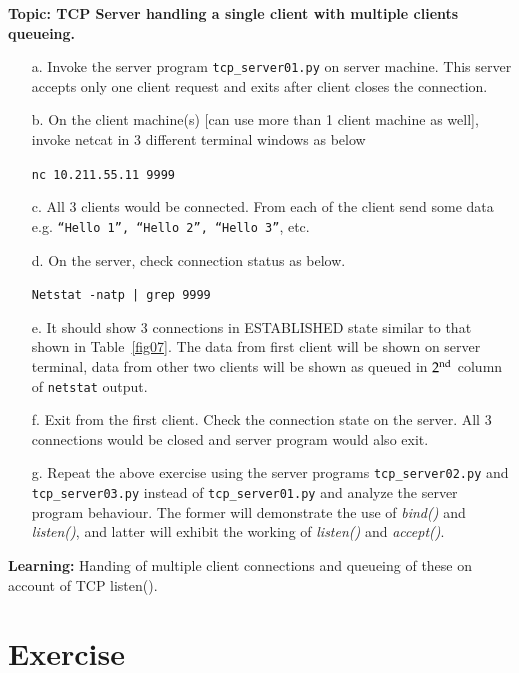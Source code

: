 \begin{multicols}{2}
\textbf{Topic: TCP Server handling a single client with multiple clients queueing.}

\begin{itemize}
\item[a.] Invoke the server program \texttt{tcp\_server01.py} on server machine. This server accepts only one client request and exits after client closes the connection.

\item[b.] On the client machine(s) [can use more than 1 client machine as well], invoke netcat in 3 different terminal windows as below

\texttt{nc 10.211.55.11 9999}

\item[c.] All 3 clients would be connected. From each of the client send some data e.g. \texttt{“Hello 1”, “Hello 2”, “Hello 3”}, etc.

\item[d.] On the server, check connection status as below. 

\texttt{Netstat -natp | grep 9999}

\item[e.] It should show 3 connections in ESTABLISHED state similar to that shown in Table~\ref{fig07}. The data from first client will be shown on server terminal, data from other two clients will be shown as queued in $2^{\rm nd}$ column of \texttt{netstat} output.
\item[f.] Exit from the first client. Check the connection state on the server. All 3 connections would be closed and server program would also exit.
\item[g.] Repeat the above exercise using the server programs \texttt{tcp\_server02.py} and \texttt{tcp\_server03.py} instead of \texttt{tcp\_server01.py} and analyze the server program behaviour. The former will demonstrate the use of \textit{bind()} and \textit{listen()}, and latter will exhibit the working of \textit{listen()} and \textit{accept()}.
\end{itemize}

\vspace{-.2cm}

\textbf{Learning:} Handing of multiple client connections and queueing of these on account of TCP listen().

\vspace{-.35cm}

\section*{Exercise \label{chap1-exe02}}


\end{multicols}
